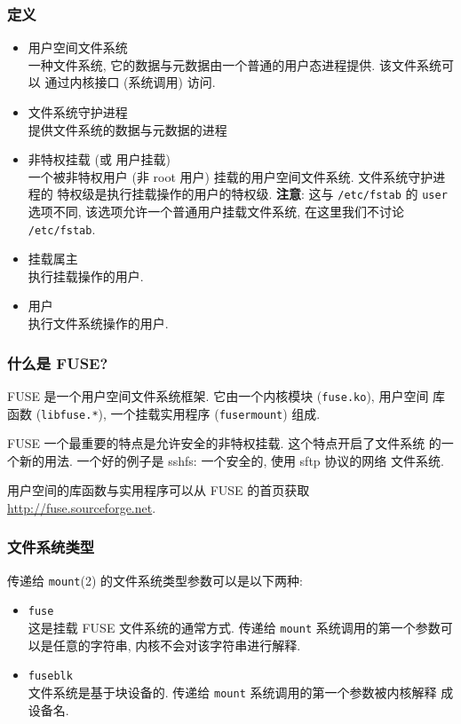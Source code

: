 \documentclass[nofonts]{ctexart}
\begin{document}
\subsubsection{定义}\label{ux5b9aux4e49}

\begin{itemize}
\item
  用户空间文件系统\\一种文件系统,
  它的数据与元数据由一个普通的用户态进程提供. 该文件系统可以
  通过内核接口 (系统调用) 访问.
\item
  文件系统守护进程\\提供文件系统的数据与元数据的进程
\item
  非特权挂载 (或 用户挂载)\\一个被非特权用户 (非 root 用户)
  挂载的用户空间文件系统. 文件系统守护进程的
  特权级是执行挂载操作的用户的特权级. \textbf{注意}: 这与
  \texttt{/etc/fstab} 的 \texttt{user} 选项不同,
  该选项允许一个普通用户挂载文件系统, 在这里我们不讨论
  \texttt{/etc/fstab}.
\item
  挂载属主\\执行挂载操作的用户.
\item
  用户\\执行文件系统操作的用户.
\end{itemize}

\subsubsection{什么是 FUSE?}\label{ux4ec0ux4e48ux662f-fuse}

FUSE 是一个用户空间文件系统框架. 它由一个内核模块 (\texttt{fuse.ko}),
用户空间 库函数 (\texttt{libfuse.*}), 一个挂载实用程序
(\texttt{fusermount}) 组成.

FUSE 一个最重要的特点是允许安全的非特权挂载. 这个特点开启了文件系统
的一个新的用法. 一个好的例子是 sshfs: 一个安全的, 使用 sftp 协议的网络
文件系统.

用户空间的库函数与实用程序可以从 FUSE 的首页获取
\url{http://fuse.sourceforge.net}.

\subsubsection{文件系统类型}\label{ux6587ux4ef6ux7cfbux7edfux7c7bux578b}

传递给 \texttt{mount}(2) 的文件系统类型参数可以是以下两种:
\begin{itemize}
    \item
\texttt{fuse}\\这是挂载 FUSE 文件系统的通常方式. 传递给 \texttt{mount}
系统调用的第一个参数可 以是任意的字符串, 内核不会对该字符串进行解释.
\item 
\texttt{fuseblk}\\文件系统是基于块设备的. 传递给 \texttt{mount}
系统调用的第一个参数被内核解释 成设备名.
\end{itemize}
\end{document}
